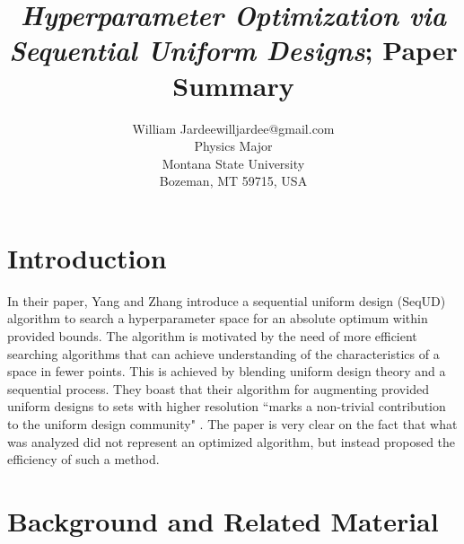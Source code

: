 \documentclass[twoside,11pt]{article}
\begin{document}
\title{{\sl Hyperparameter Optimization via Sequential Uniform Designs}; Paper Summary}

\author{\name William Jardee\email willjardee@gmail.com \\
       \addr Physics Major\\
       Montana State University\\
       Bozeman, MT 59715, USA
       }

\maketitle


\section{Introduction}
In their paper, Yang and Zhang introduce a sequential uniform design (SeqUD) algorithm to search a hyperparameter space for an absolute optimum within provided bounds. The algorithm is motivated by the need of more efficient searching algorithms that can achieve understanding of the characteristics of a space in fewer points. This is achieved by blending uniform design theory and a sequential process. They boast that their algorithm for augmenting provided uniform designs to sets with higher resolution ``marks a non-trivial contribution to the uniform design community" \citep{yang2021hyperparameter}. The paper is very clear on the fact that what was analyzed did not represent an optimized algorithm, but instead proposed the efficiency of such a method.

\section{Background and Related Material}

\end{document}

